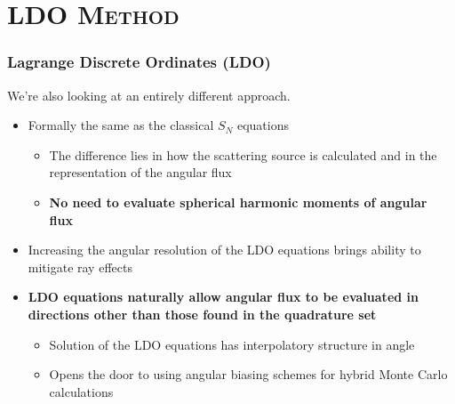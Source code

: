 \documentclass[xcolor=x11names,compress,handout]{beamer}
\renewcommand{\(}{\begin{columns}}
\renewcommand{\)}{\end{columns}}
\newcommand{\<}[1]{\begin{column}{#1}}
\renewcommand{\>}{\end{column}}
\newcommand{\vOmega}{\ensuremath{\hat{\Omega}}}
\newcommand{\vecr}{\vec{r}}
\newcommand{\dn}{d_N}
\begin{document}
\section{\scshape LDO Method}
\begin{frame}[fragile]

  \frametitle{Lagrange Discrete Ordinates (LDO) \cite{Ahrens2015}}

   We're also looking at an entirely different approach.    
\pause
\begin{itemize}
\item{Formally the same as the classical $S_N$ equations}
	\begin{itemize}
	\pause
	\item{The difference lies in how the scattering source is calculated and in the representation of the angular flux}
	\pause
	\item{\textbf{No need to evaluate spherical harmonic moments of angular flux}}
	\end{itemize}
\pause
\item{Increasing the angular resolution of the LDO equations brings ability to mitigate ray effects}
\pause
\item{\textbf{LDO equations naturally allow angular flux to be evaluated in directions other than those found in the quadrature set}}
	\begin{itemize}
	\pause
	\item{Solution of the LDO equations has interpolatory structure in angle}
	\pause
	\item{Opens the door to using angular biasing schemes for hybrid Monte Carlo calculations}
	\end{itemize}
\end{itemize}

\end{frame}

\end{document}
